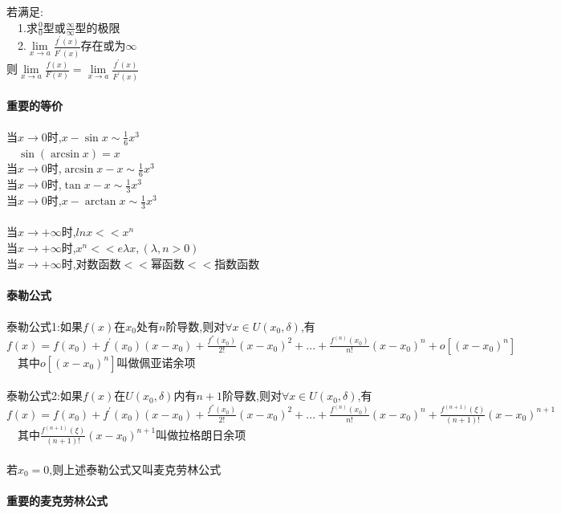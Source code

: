 \documentclass{article}
\begin{document}
\begin{flushleft}
	若满足:\\
	\ \ 1.求$\frac{0}{0}$型或$\frac{\infty}{\infty}$型的极限\\
	\ \ 2.$\lim\limits_{x\to a}\frac{f^{'}(x)}{F^{'}(x)}$存在或为$\infty$\\
	则$\lim\limits_{x\to a}\frac{f(x)}{F(x)}=\lim\limits_{x\to a}\frac{f^{'}(x)}{F^{'}(x)}$\\
	
	~\\ \textbf{重要的等价} \\~\\
	
	当$x\to 0$时,$x-\sin x \sim \frac{1}{6}x^3$\\
	\ \ $\sin(\arcsin x)=x$\\
	当$x\to 0$时,$\arcsin x-x \sim \frac{1}{6}x^3$\\
	当$x\to 0$时,$\tan x-x \sim \frac{1}{3}x^3$\\
	当$x\to 0$时,$x-\arctan x \sim \frac{1}{3}x^3$\\
	~\\
	当$x\to +\infty$时,$lnx << x^n$\\
	当$x\to +\infty$时,$x^n << e{\lambda x},(\lambda,n>0)$\\
	当$x\to +\infty$时,对数函数$<<$幂函数$<<$指数函数\\
	
	~\\ \textbf{泰勒公式} \\~\\
	
	泰勒公式1:如果$f(x)$在$x_0$处有$n$阶导数,则对$\forall x \in U(x_0,\delta)$,有$f(x)=f(x_0)+f^{'}(x_0)(x-x_0)+\frac{f^{''}(x_0)}{2!}(x-x_0)^2+...+\frac{f^{(n)}(x_0)}{n!}(x-x_0)^n+o[(x-x_0)^n]$\\
	\ \ 其中$o[(x-x_0)^n]$叫做佩亚诺余项\\
	~\\
	泰勒公式2:如果$f(x)$在$U(x_0,\delta)$内有$n+1$阶导数,则对$\forall x \in U(x_0,\delta)$,有$f(x)=f(x_0)+f^{'}(x_0)(x-x_0)+\frac{f^{''}(x_0)}{2!}(x-x_0)^2+...+\frac{f^{(n)}(x_0)}{n!}(x-x_0)^n+\frac{f^{(n+1)}(\xi)}{(n+1)!}(x-x_0)^{n+1}$\\
	\ \ 其中$\frac{f^{(n+1)}(\xi)}{(n+1)!}(x-x_0)^{n+1}$叫做拉格朗日余项\\
	~\\
	若$x_0=0$,则上述泰勒公式又叫麦克劳林公式\\
	
	~\\ \textbf{重要的麦克劳林公式} \\~\\
	

\end{flushleft}
\end{document}
